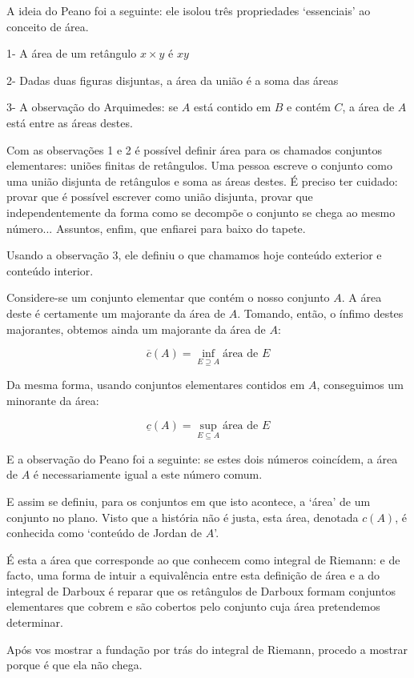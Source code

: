 \documentclass{article}
\begin{document}
A ideia do Peano foi a seguinte: ele isolou três propriedades `essenciais' ao conceito de área.

1- A área de um retângulo $x \times y$ é $xy$

2- Dadas duas figuras disjuntas, a área da união é a soma das áreas

3- A observação do Arquimedes: se $A$ está contido em $B$ e contém $C$, a área de $A$ está entre as áreas destes.

Com as observações 1 e 2 é possível definir área para os chamados conjuntos elementares: uniões finitas de retângulos. Uma pessoa escreve o conjunto como uma união disjunta de retângulos e soma as áreas destes. É preciso ter cuidado: provar que é possível escrever como união disjunta, provar que independentemente da forma como se decompõe o conjunto se chega ao mesmo número... Assuntos, enfim, que enfiarei para baixo do tapete.

Usando a observação $3$, ele definiu o que chamamos hoje conteúdo exterior e conteúdo interior.

Considere-se um conjunto elementar que contém o nosso conjunto $A$. A área deste é certamente um majorante da área de $A$. Tomando, então, o ínfimo destes majorantes, obtemos ainda um majorante da área de $A$:

\[\overline c (A) = \inf_{E \supseteq A} \text{área de $E$}\]

Da mesma forma, usando conjuntos elementares contidos em $A$, conseguimos um minorante da área:

\[\underline c (A) = \sup_{E \subseteq A} \text{área de $E$}\]

E a observação do Peano foi a seguinte: se estes dois números coincídem, a área de $A$ é necessariamente igual a este número comum.

E assim se definiu, para os conjuntos em que isto acontece, a `área' de um conjunto no plano. Visto que a história não é justa, esta área, denotada $c(A)$, é conhecida como `conteúdo de Jordan de $A$'.

É esta a área que corresponde ao que conhecem como integral de Riemann: e de facto, uma forma de intuir a equivalência entre esta definição de área e a do integral de Darboux é reparar que os retângulos de Darboux formam conjuntos elementares que cobrem e são cobertos pelo conjunto cuja área pretendemos determinar.

Após vos mostrar a fundação por trás do integral de Riemann, procedo a mostrar porque é que ela não chega.
\end{document}
